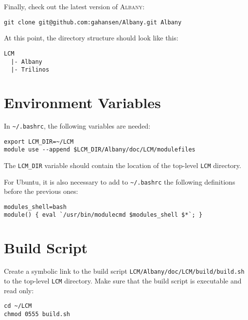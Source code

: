 \documentclass{article}
\newcommand{\albany}{\textsc{Albany}}
\begin{document}
Finally, check out the latest version of \albany{}:
\begin{verbatim}
git clone git@github.com:gahansen/Albany.git Albany
\end{verbatim}

At this point, the directory structure should look like this:
\begin{verbatim}
LCM
  |- Albany
  |- Trilinos
\end{verbatim}

\section{Environment Variables}
In \verb+~/.bashrc+, the following variables are needed:
\begin{verbatim}
export LCM_DIR=~/LCM
module use --append $LCM_DIR/Albany/doc/LCM/modulefiles
\end{verbatim}
The \verb+LCM_DIR+ variable should contain the location of the
top-level \verb+LCM+ directory.

For Ubuntu, it is also necessary to add to \verb+~/.bashrc+ the following
definitions before the previous ones:
\begin{verbatim}
modules_shell=bash
module() { eval `/usr/bin/modulecmd $modules_shell $*`; }
\end{verbatim}

\section{Build Script}
Create a symbolic link to the build script
\verb+LCM/Albany/doc/LCM/build/build.sh+ to the top-level \verb+LCM+
directory. Make sure that the build script is executable and
read only:
\begin{verbatim}
cd ~/LCM
chmod 0555 build.sh
\end{verbatim}
\end{document}
